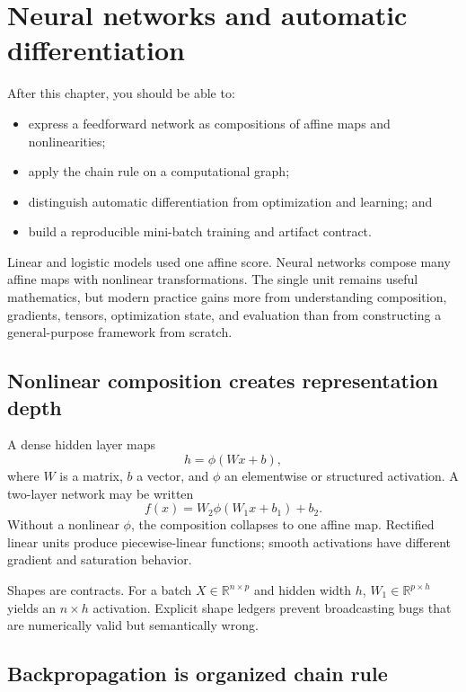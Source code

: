 \chapter{Neural networks and automatic differentiation}
\label{ch:neural-networks}

\begin{learningobjectives}
After this chapter, you should be able to:
\begin{itemize}
  \item express a feedforward network as compositions of affine maps and nonlinearities;
  \item apply the chain rule on a computational graph;
  \item distinguish automatic differentiation from optimization and learning; and
  \item build a reproducible mini-batch training and artifact contract.
\end{itemize}
\end{learningobjectives}

\begin{chapterconnection}
Linear and logistic models used one affine score. Neural networks compose many
affine maps with nonlinear transformations. The single unit remains useful
mathematics, but modern practice gains more from understanding composition,
gradients, tensors, optimization state, and evaluation than from constructing a
general-purpose framework from scratch.
\end{chapterconnection}

\section{Nonlinear composition creates representation depth}

A dense hidden layer maps
\[
h=\phi(Wx+b),
\]
where $W$ is a matrix, $b$ a vector, and $\phi$ an elementwise or structured
activation. A two-layer network may be written
\[
f(x)=W_2\phi(W_1x+b_1)+b_2.
\]
Without a nonlinear $\phi$, the composition collapses to one affine map.
Rectified linear units produce piecewise-linear functions; smooth activations
have different gradient and saturation behavior.

Shapes are contracts. For a batch $X\in\mathbb{R}^{n\times p}$ and hidden width
$h$, $W_1\in\mathbb{R}^{p\times h}$ yields an $n\times h$ activation. Explicit
shape ledgers prevent broadcasting bugs that are numerically valid but
semantically wrong.

\section{Backpropagation is organized chain rule}

